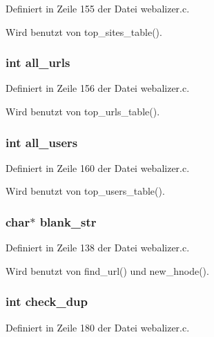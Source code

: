 Definiert in Zeile 155 der Datei webalizer.c.

Wird benutzt von top\_\-sites\_\-table().
\subsubsection{\setlength{\rightskip}{0pt plus 5cm}int {\bf all\_\-urls}}\label{webalizer_8h_633444563a9587349d9a5f158062b662}




Definiert in Zeile 156 der Datei webalizer.c.

Wird benutzt von top\_\-urls\_\-table().
\subsubsection{\setlength{\rightskip}{0pt plus 5cm}int {\bf all\_\-users}}\label{webalizer_8h_395ccae1fd2f2450f623db87fbd9f9e1}




Definiert in Zeile 160 der Datei webalizer.c.

Wird benutzt von top\_\-users\_\-table().
\subsubsection{\setlength{\rightskip}{0pt plus 5cm}char$\ast$ {\bf blank\_\-str}}\label{webalizer_8h_8c3c3d8858d6430eea049c5989d2bf6d}




Definiert in Zeile 138 der Datei webalizer.c.

Wird benutzt von find\_\-url() und new\_\-hnode().
\subsubsection{\setlength{\rightskip}{0pt plus 5cm}int {\bf check\_\-dup}}\label{webalizer_8h_b1757477076fc2811cf714a92dc18d0f}




Definiert in Zeile 180 der Datei webalizer.c.
